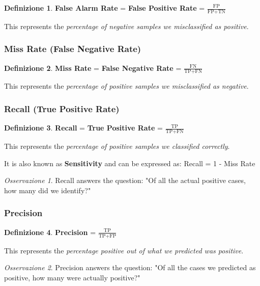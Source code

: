 \documentclass[11pt,a4paper]{article}
\theoremstyle{definition}
\newtheorem{definition}{Definizione}[section]
\theoremstyle{plain}
\theoremstyle{remark}
\newtheorem*{observation}{Osservazione}
\begin{document}
\begin{definition}
\textbf{False Alarm Rate} = \textbf{False Positive Rate} = $\frac{\text{FP}}{\text{FP} + \text{TN}}$

This represents the \textit{percentage of negative samples we misclassified as positive}.
\end{definition}

\subsubsection{Miss Rate (False Negative Rate)}

\begin{definition}
\textbf{Miss Rate} = \textbf{False Negative Rate} = $\frac{\text{FN}}{\text{TP} + \text{FN}}$

This represents the \textit{percentage of positive samples we misclassified as negative}.
\end{definition}

\subsubsection{Recall (True Positive Rate)}

\begin{definition}
\textbf{Recall} = \textbf{True Positive Rate} = $\frac{\text{TP}}{\text{TP} + \text{FN}}$

This represents the \textit{percentage of positive samples we classified correctly}. 

It is also known as \textbf{Sensitivity} and can be expressed as: Recall = 1 - Miss Rate
\end{definition}

\begin{observation}
Recall answers the question: "Of all the actual positive cases, how many did we identify?"
\end{observation}

\subsubsection{Precision}

\begin{definition}
\textbf{Precision} = $\frac{\text{TP}}{\text{TP} + \text{FP}}$

This represents the \textit{percentage positive out of what we predicted was positive}.
\end{definition}

\begin{observation}
Precision answers the question: "Of all the cases we predicted as positive, how many were actually positive?"
\end{observation}
\end{document}
